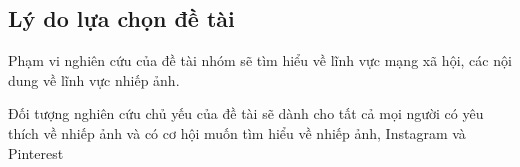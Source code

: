 \subsection{Lý do lựa chọn đề tài}
Phạm vi nghiên cứu của đề tài nhóm sẽ tìm hiểu về lĩnh vực mạng xã hội, các nội dung về lĩnh vực nhiếp ảnh.\par
Đối tượng nghiên cứu chủ yếu của đề tài sẽ dành cho tất cả mọi người có yêu thích về nhiếp ảnh và 
có cơ hội muốn tìm hiểu về nhiếp ảnh, Instagram và Pinterest
    
